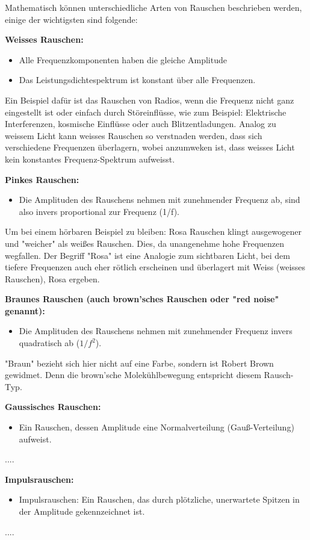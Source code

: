 Mathematisch können unterschiedliche Arten von Rauschen beschrieben werden, einige der wichtigsten sind folgende: 


\textbf{Weisses Rauschen:}
	\begin{itemize}
	\item Alle Frequenzkomponenten haben die gleiche Amplitude
	\item Das Leistungsdichtespektrum ist konstant über alle Frequenzen. 
\end{itemize}
Ein Beispiel dafür ist das Rauschen von Radios, wenn die Frequenz nicht ganz eingestellt ist oder einfach durch Störeinflüsse, wie zum Beispiel: Elektrische Interferenzen, kosmische Einflüsse oder auch Blitzentladungen. Analog zu weissem Licht kann weisses Rauschen so verstnaden werden, dass sich verschiedene Frequenzen überlagern, wobei anzumweken ist, dass weisses Licht kein konstantes Frequenz-Spektrum aufweisst.


\textbf{Pinkes Rauschen:}
\begin{itemize}
	\item Die Amplituden des Rauschens nehmen mit zunehmender Frequenz ab, sind also invers proportional zur Frequenz (1/f).
\end{itemize}
Um bei einem hörbaren Beispiel zu bleiben: Rosa Rauschen klingt ausgewogener und "weicher" als weißes Rauschen. Dies, da unangenehme hohe Frequenzen wegfallen. Der Begriff "Rosa" ist eine Analogie zum sichtbaren Licht, bei dem tiefere Frequenzen auch eher rötlich erscheinen und überlagert mit Weiss (weisses Rauschen), Rosa ergeben.


\textbf{Braunes Rauschen (auch brown'sches Rauschen oder "red noise" genannt):}
\begin{itemize}
	\item Die Amplituden des Rauschens nehmen mit zunehmender Frequenz invers quadratisch ab ($ 1/f^2 $).
\end{itemize}
"Braun" bezieht sich hier nicht auf eine Farbe, sondern ist Robert Brown gewidmet. Denn die brown'sche Molekühlbewegung entspricht diesem Rausch-Typ.


\textbf{Gaussisches Rauschen:}
\begin{itemize}
	\item Ein Rauschen, dessen Amplitude eine Normalverteilung (Gauß-Verteilung) aufweist.
\end{itemize}
....


\textbf{Impulsrauschen:}
\begin{itemize}
	\item Impulsrauschen: Ein Rauschen, das durch plötzliche, unerwartete Spitzen in der Amplitude gekennzeichnet ist.
\end{itemize}
	....

